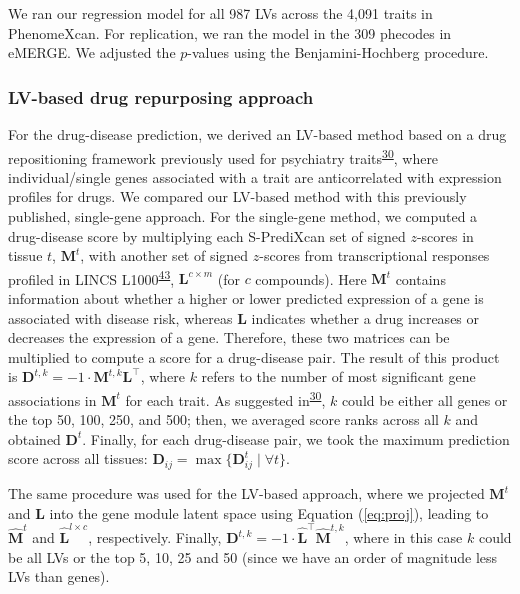 \documentclass[
  a4paper,
]{article}
\begin{document}
We ran our regression model for all 987 LVs across the 4,091 traits in PhenomeXcan.
For replication, we ran the model in the 309 phecodes in eMERGE.
We adjusted the \(p\)-values using the Benjamini-Hochberg procedure.

\hypertarget{sec:methods:drug}{%
\subsubsection{LV-based drug repurposing approach}\label{sec:methods:drug}}

For the drug-disease prediction, we derived an LV-based method based on a drug repositioning framework previously used for psychiatry traits\textsuperscript{\protect\hyperlink{ref-17oeJ0CXy}{30}}, where individual/single genes associated with a trait are anticorrelated with expression profiles for drugs.
We compared our LV-based method with this previously published, single-gene approach.
For the single-gene method, we computed a drug-disease score by multiplying each S-PrediXcan set of signed \(z\)-scores in tissue \(t\), \(\mathbf{M}^t\), with another set of signed \(z\)-scores from transcriptional responses profiled in LINCS L1000\textsuperscript{\protect\hyperlink{ref-F7lIlh2N}{43}}, \(\mathbf{L}^{c \times m}\) (for \(c\) compounds).
Here \(\mathbf{M}^t\) contains information about whether a higher or lower predicted expression of a gene is associated with disease risk, whereas \(\mathbf{L}\) indicates whether a drug increases or decreases the expression of a gene.
Therefore, these two matrices can be multiplied to compute a score for a drug-disease pair.
The result of this product is \(\mathbf{D}^{t,k}=-1 \cdot \mathbf{M}^{t,k} \mathbf{L}^\top\), where \(k\) refers to the number of most significant gene associations in \(\mathbf{M}^t\) for each trait.
As suggested in\textsuperscript{\protect\hyperlink{ref-17oeJ0CXy}{30}}, \(k\) could be either all genes or the top 50, 100, 250, and 500; then, we averaged score ranks across all \(k\) and obtained \(\mathbf{D}^t\).
Finally, for each drug-disease pair, we took the maximum prediction score across all tissues: \(\mathbf{D}_{ij} = \max \{ \mathbf{D}_{ij}^t \mid \forall t \}\).

The same procedure was used for the LV-based approach, where we projected \(\mathbf{M}^{t}\) and \(\mathbf{L}\) into the gene module latent space using Equation (\ref{eq:proj}), leading to \(\hat{\mathbf{M}}^t\) and \(\hat{\mathbf{L}}^{l \times c}\), respectively.
Finally, \(\mathbf{D}^{t,k}=-1 \cdot \hat{\mathbf{L}}^{\top} \hat{\mathbf{M}}^{t,k}\), where in this case \(k\) could be all LVs or the top 5, 10, 25 and 50 (since we have an order of magnitude less LVs than genes).
\end{document}
